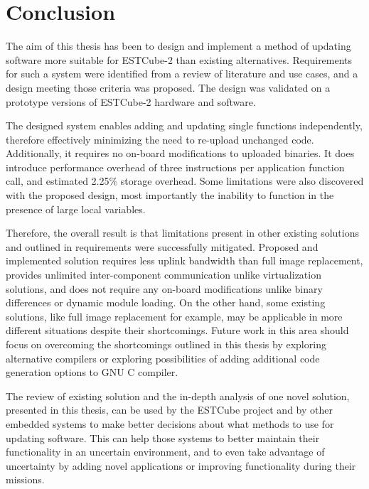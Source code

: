\clearpage
\section{Conclusion}
\label{s:conclusion}

The aim of this thesis has been to design and implement a method of updating software more suitable for ESTCube-2 than existing alternatives. Requirements for such a system were identified from a review of literature and use cases, and a design meeting those criteria was proposed. The design was validated on a prototype versions of ESTCube-2 hardware and software.

The designed system enables adding and updating single functions independently, therefore effectively minimizing the need to re-upload unchanged code. Additionally, it requires no on-board modifications to uploaded binaries. It does introduce performance overhead of three instructions per application function call, and estimated 2.25\% storage overhead. Some limitations were also discovered with the proposed design, most importantly the inability to function in the presence of large local variables.

Therefore, the overall result is that limitations present in other existing solutions and outlined in requirements were successfully mitigated. Proposed and implemented solution requires less uplink bandwidth than full image replacement, provides unlimited inter-component communication unlike virtualization solutions, and does not require any on-board modifications unlike binary differences or dynamic module loading. On the other hand, some existing solutions, like full image replacement for example, may be applicable in more different situations despite their shortcomings. Future work in this area should focus on overcoming the shortcomings outlined in this thesis by exploring alternative compilers or exploring possibilities of adding additional code generation options to GNU C compiler.

The review of existing solution and the in-depth analysis of one novel solution, presented in this thesis, can be used by the ESTCube project and by other embedded systems to make better decisions about what methods to use for updating software. This can help those systems to better maintain their functionality in an uncertain environment, and to even take advantage of uncertainty by adding novel applications or improving functionality during their missions.
